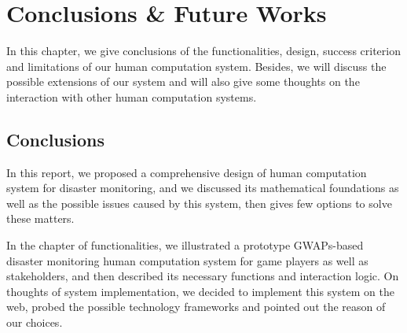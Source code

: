\section{Conclusions \& Future Works}

In this chapter, we give conclusions of the functionalities, design, success criterion and limitations 
of our human computation system. 
Besides, we will discuss the possible extensions of our system and will also give some thoughts on 
the interaction with other human computation systems.

\subsection{Conclusions}

In this report, we proposed a comprehensive design of human computation system for disaster monitoring,
and we discussed its mathematical foundations as well as the possible issues caused by this system,
then gives few options to solve these matters. 

In the chapter of functionalities, we illustrated a prototype GWAPs-based disaster monitoring
human computation system for game players as well as stakeholders, and then described its
necessary functions and interaction logic. On thoughts of system implementation, we decided to implement 
this system on the web, probed the possible technology frameworks and pointed out the reason of our choices.

